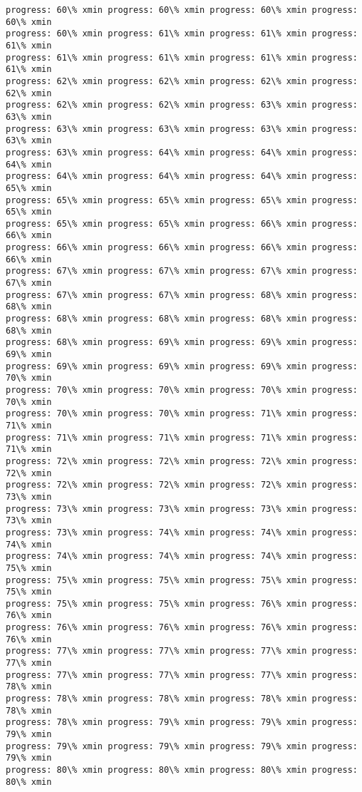 \documentclass[11pt]{article}
\begin{document}
\begin{Verbatim}[commandchars=\\\{\}]
progress: 60\% xmin progress: 60\% xmin progress: 60\% xmin progress: 60\% xmin
progress: 60\% xmin progress: 61\% xmin progress: 61\% xmin progress: 61\% xmin
progress: 61\% xmin progress: 61\% xmin progress: 61\% xmin progress: 61\% xmin
progress: 62\% xmin progress: 62\% xmin progress: 62\% xmin progress: 62\% xmin
progress: 62\% xmin progress: 62\% xmin progress: 63\% xmin progress: 63\% xmin
progress: 63\% xmin progress: 63\% xmin progress: 63\% xmin progress: 63\% xmin
progress: 63\% xmin progress: 64\% xmin progress: 64\% xmin progress: 64\% xmin
progress: 64\% xmin progress: 64\% xmin progress: 64\% xmin progress: 65\% xmin
progress: 65\% xmin progress: 65\% xmin progress: 65\% xmin progress: 65\% xmin
progress: 65\% xmin progress: 65\% xmin progress: 66\% xmin progress: 66\% xmin
progress: 66\% xmin progress: 66\% xmin progress: 66\% xmin progress: 66\% xmin
progress: 67\% xmin progress: 67\% xmin progress: 67\% xmin progress: 67\% xmin
progress: 67\% xmin progress: 67\% xmin progress: 68\% xmin progress: 68\% xmin
progress: 68\% xmin progress: 68\% xmin progress: 68\% xmin progress: 68\% xmin
progress: 68\% xmin progress: 69\% xmin progress: 69\% xmin progress: 69\% xmin
progress: 69\% xmin progress: 69\% xmin progress: 69\% xmin progress: 70\% xmin
progress: 70\% xmin progress: 70\% xmin progress: 70\% xmin progress: 70\% xmin
progress: 70\% xmin progress: 70\% xmin progress: 71\% xmin progress: 71\% xmin
progress: 71\% xmin progress: 71\% xmin progress: 71\% xmin progress: 71\% xmin
progress: 72\% xmin progress: 72\% xmin progress: 72\% xmin progress: 72\% xmin
progress: 72\% xmin progress: 72\% xmin progress: 72\% xmin progress: 73\% xmin
progress: 73\% xmin progress: 73\% xmin progress: 73\% xmin progress: 73\% xmin
progress: 73\% xmin progress: 74\% xmin progress: 74\% xmin progress: 74\% xmin
progress: 74\% xmin progress: 74\% xmin progress: 74\% xmin progress: 75\% xmin
progress: 75\% xmin progress: 75\% xmin progress: 75\% xmin progress: 75\% xmin
progress: 75\% xmin progress: 75\% xmin progress: 76\% xmin progress: 76\% xmin
progress: 76\% xmin progress: 76\% xmin progress: 76\% xmin progress: 76\% xmin
progress: 77\% xmin progress: 77\% xmin progress: 77\% xmin progress: 77\% xmin
progress: 77\% xmin progress: 77\% xmin progress: 77\% xmin progress: 78\% xmin
progress: 78\% xmin progress: 78\% xmin progress: 78\% xmin progress: 78\% xmin
progress: 78\% xmin progress: 79\% xmin progress: 79\% xmin progress: 79\% xmin
progress: 79\% xmin progress: 79\% xmin progress: 79\% xmin progress: 79\% xmin
progress: 80\% xmin progress: 80\% xmin progress: 80\% xmin progress: 80\% xmin

\end{Verbatim}
\end{document}
